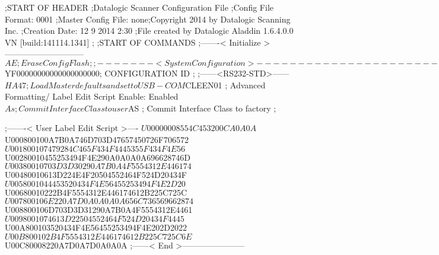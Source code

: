 ;START OF HEADER
;Datalogic Scanner Configuration File
;Config File Format: 0001
;Master Config File: none;Copyright 2014 by Datalogic Scanning Inc.
;Creation Date: 12 9 2014 2:30
;File created by Datalogic Aladdin 1.6.4.0.0 VN [build:141114.1341]
;
;START OF COMMANDS
;-------< Initialize >-----------------------------
$AE                 ; Erase Config Flash
;
;-------< System Configuration >-------------------------------
$YF00000000000000000000; CONFIGURATION ID
;
;------<RS232-STD>------
$HA47               ; Load Master defaults and set to USB-COM
$CLEEN01            ; Advanced Formatting/ Label Edit Script Enable: Enabled
$As                 ; Commit Interface Class to user
$AS                 ; Commit Interface Class to factory
;

;-------< User Label Edit Script >----
$U00000008554C453200CA0A0A
$U000800100A7B0A746D703D47657450726F706572
$U001800107479284C465F434F4445355F434F4E56
$U00280010455253494F4E290A0A0A0A696628746D
$U00380010703D3D30290A7B0A4F5554312E446174
$U00480010613D224E4F20504552464F524D20434F
$U0058001044453520434F4E56455253494F4E2D20
$U00680010222B4F5554312E446174612B225C725C
$U007800106E220A7D0A0A0A0A656C736569662874
$U008800106D703D3D31290A7B0A4F5554312E4461
$U0098001074613D22504552464F524D20434F4445
$U00A800103520434F4E56455253494F4E202D2022
$U00B800102B4F5554312E446174612B225C725C6E
$U00C80008220A7D0A7D0A0A0A
;------< End >-----------------------
